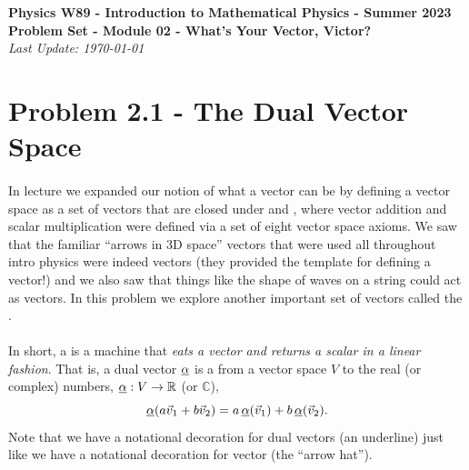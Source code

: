 \documentclass{article}
\begin{document}
\addcopyright
\begin{center}
{\bf \large Physics W89 - Introduction to Mathematical Physics - Summer 2023}\\\medskip
{\bf \large Problem Set - Module 02 - What's Your Vector, Victor?} \\\medskip
{\emph{Last Update: \today}}
\end{center}


\dphline\bigskip
\section*{Problem 2.1 - The Dual Vector Space}

\paragraph{}
In lecture we expanded our notion of what a vector can be by defining a vector space as a set of vectors that are closed under  and ,
where vector addition and scalar multiplication were defined via a set of eight vector space axioms.  
We saw that the familiar ``arrows in 3D space'' vectors that were used all throughout intro physics were indeed vectors (they
provided the template for defining a vector!) and we also saw that things like the shape of waves on a string could act as vectors.  In this problem we explore another
important set of vectors called the .

\paragraph{}
In short, a  is a machine that \emph{eats a vector and returns a scalar in a linear fashion}.  That is, a dual vector $\underline{\alpha}$ is a
 from a vector space $V$ to the real (or complex) numbers, $\underline{\alpha}:V\to\mathbb{R}$ (or $\mathbb{C}$),
	\begin{equation}
		\underline{\alpha}(a\vec{v}_{1}+b\vec{v}_{2}) = a\,\underline{\alpha}(\vec{v}_{1})+ b\,\underline{\alpha}(\vec{v}_{2}).
	\label{duallinear}
	\end{equation}
Note that we have a notational decoration for dual vectors (an underline) just like we have a notational decoration for vector (the ``arrow hat'').
\end{document}
